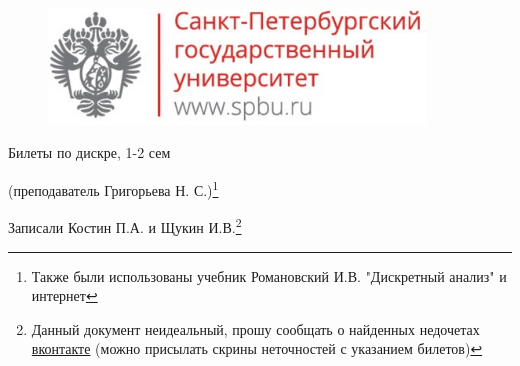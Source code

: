 \documentclass[12pt, fleqn]{article}
\begin{document}
  \begin{figure}[H]
      \includegraphics[width=10cm]{../../../template/spsu.jpg}
      \centering
  \end{figure}
  \begin{center}
    \huge Билеты по дискре, 1-2 сем

    \Large (преподаватель Григорьева Н. С.)\footnote{Также были использованы учебник Романовский И.В. "Дискретный анализ"{} и интернет}

    \large Записали Костин П.А. и Щукин И.В.\footnote{Данный документ неидеальный, прошу сообщать о найденных недочетах \href{https://vk.com/drab_existence_a}{вконтакте} (можно присылать скрины неточностей с указанием билетов)}
  \end{center}

  \newpage
  \tableofcontents
  \newpage

  

  

  

  

  
\end{document}
